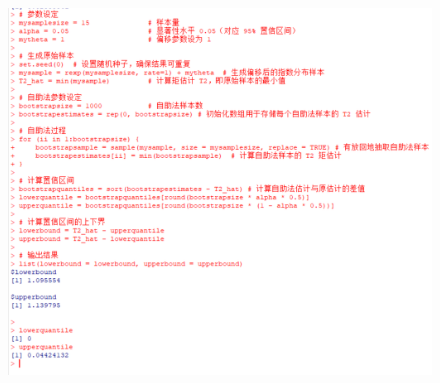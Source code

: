 \documentclass[UTF8]{report}
\theoremstyle{MyLineTheoremStyle} %
\theoremstyle{MyBlockTheoremStyle} %
\theoremstyle{MySubsubsectionStyle} %
\begin{document}
\begin{figure}[H]
    \centering
    \includegraphics[width=1\textwidth]{2024.11.6_3.png}
\end{figure}



    
    
    
    
    
\end{document}
